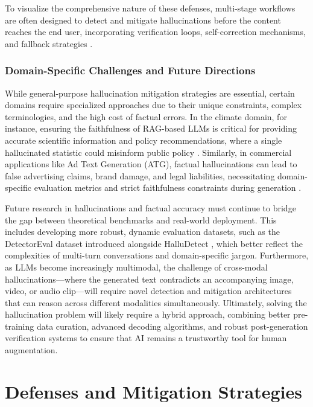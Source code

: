 \documentclass[11pt,a4paper]{article}
\begin{document}
To visualize the comprehensive nature of these defenses, multi-stage workflows are often designed to detect and mitigate hallucinations before the content reaches the end user, incorporating verification loops, self-correction mechanisms, and fallback strategies \cite{Wang_2024_Developing}.

\subsubsection{Domain-Specific Challenges and Future Directions}

While general-purpose hallucination mitigation strategies are essential, certain domains require specialized approaches due to their unique constraints, complex terminologies, and the high cost of factual errors. In the climate domain, for instance, ensuring the faithfulness of RAG-based LLMs is critical for providing accurate scientific information and policy recommendations, where a single hallucinated statistic could misinform public policy \cite{Thulke_2025_Listen}. Similarly, in commercial applications like Ad Text Generation (ATG), factual hallucinations can lead to false advertising claims, brand damage, and legal liabilities, necessitating domain-specific evaluation metrics and strict faithfulness constraints during generation \cite{Kato_2024_Faithcamera}.

Future research in hallucinations and factual accuracy must continue to bridge the gap between theoretical benchmarks and real-world deployment. This includes developing more robust, dynamic evaluation datasets, such as the DetectorEval dataset introduced alongside HalluDetect \cite{Anaokar_2025_Halludetect}, which better reflect the complexities of multi-turn conversations and domain-specific jargon. Furthermore, as LLMs become increasingly multimodal, the challenge of cross-modal hallucinations---where the generated text contradicts an accompanying image, video, or audio clip---will require novel detection and mitigation architectures that can reason across different modalities simultaneously. Ultimately, solving the hallucination problem will likely require a hybrid approach, combining better pre-training data curation, advanced decoding algorithms, and robust post-generation verification systems to ensure that AI remains a trustworthy tool for human augmentation.

\section{Defenses and Mitigation Strategies}
\end{document}
